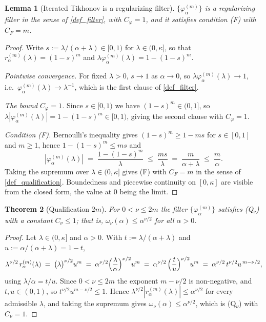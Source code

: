 \documentclass[a4paper]{report}
\theoremstyle{plain}
\newtheorem{theorem}{Theorem}[chapter]
\newtheorem{lemma}[theorem]{Lemma}
\theoremstyle{definition}
\theoremstyle{remark}
\begin{document}
\begin{lemma}[Iterated Tikhonov is a regularizing filter]
  \label{lem_iterated_tikhonov_filter}
  $\{\varphi^{(m)}_{\alpha}\}$ is a regularizing filter in the sense of
  \cref{def_filter}, with $C_{\varphi} = 1$, and it satisfies condition (F) with
  $C_F = m$.
\end{lemma}
\begin{proof}
  Write $s := \lambda/(\alpha+\lambda) \in [0,1)$ for $\lambda \in (0,\kappa]$, so that
  $r^{(m)}_{\alpha}(\lambda) = (1-s)^{m}$ and
  $\lambda\varphi^{(m)}_{\alpha}(\lambda) = 1-(1-s)^{m}$.

  \emph{Pointwise convergence.}  For fixed $\lambda > 0$, $s \to 1$ as $\alpha \to 0$, so
  $\lambda\varphi^{(m)}_{\alpha}(\lambda) \to 1$, i.e.\
  $\varphi^{(m)}_{\alpha}(\lambda) \to \lambda^{-1}$, which is the first clause of
  \cref{def_filter}.

  \emph{The bound $C_{\varphi} = 1$.}  Since $s \in [0,1)$ we have
  $(1-s)^{m} \in (0,1]$, so
  $\lambda|\varphi^{(m)}_{\alpha}(\lambda)| = 1-(1-s)^{m} \in [0,1)$, giving the second
  clause with $C_{\varphi}=1$.

  \emph{Condition (F).}  Bernoulli's inequality gives $(1-s)^{m} \ge 1-ms$ for
  $s \in [0,1]$ and $m \ge 1$, hence $1-(1-s)^{m} \le ms$ and
  \[
    |\varphi^{(m)}_{\alpha}(\lambda)| \;=\; \frac{1-(1-s)^{m}}{\lambda}
      \;\le\; \frac{ms}{\lambda} \;=\; \frac{m}{\alpha+\lambda} \;\le\; \frac{m}{\alpha} .
  \]
  Taking the supremum over $\lambda \in (0,\kappa]$ gives (F) with $C_F = m$ in the sense
  of \cref{def_qualification}.  Boundedness and piecewise continuity on $[0,\kappa]$ are
  visible from the closed form, the value at $0$ being the limit.
\end{proof}


\begin{theorem}[Qualification $2m$]
  \label{thm_iterated_tikhonov_qualification}
  For $0 < \nu \le 2m$ the filter $\{\varphi^{(m)}_{\alpha}\}$ satisfies (Q$_{\nu}$) with
  a constant $C_{\nu} \le 1$; that is,
  $\omega_{\nu}(\alpha) \le \alpha^{\nu/2}$ for all $\alpha > 0$.
\end{theorem}
\begin{proof}
  Let $\lambda \in (0,\kappa]$ and $\alpha > 0$.  With $t := \lambda/(\alpha+\lambda)$ and
  $u := \alpha/(\alpha+\lambda) = 1-t$,
  \[
    \lambda^{\nu/2}\,r^{(m)}_{\alpha}(\lambda)
      \;=\; \bigl(\lambda\bigr)^{\nu/2}u^{m}
      \;=\; \alpha^{\nu/2}\Bigl(\frac{\lambda}{\alpha}\Bigr)^{\nu/2}u^{m}
      \;=\; \alpha^{\nu/2}\,\Bigl(\frac{t}{u}\Bigr)^{\nu/2}u^{m}
      \;=\; \alpha^{\nu/2}\,t^{\nu/2}u^{\,m-\nu/2} ,
  \]
  using $\lambda/\alpha = t/u$.  Since $0 < \nu \le 2m$ the exponent $m-\nu/2$ is
  non-negative, and $t,u \in (0,1)$, so $t^{\nu/2}u^{m-\nu/2} \le 1$.  Hence
  $\lambda^{\nu/2}|r^{(m)}_{\alpha}(\lambda)| \le \alpha^{\nu/2}$ for every admissible
  $\lambda$, and taking the supremum gives
  $\omega_{\nu}(\alpha) \le \alpha^{\nu/2}$, which is (Q$_{\nu}$) with $C_{\nu} = 1$.
\end{proof}
\end{document}
